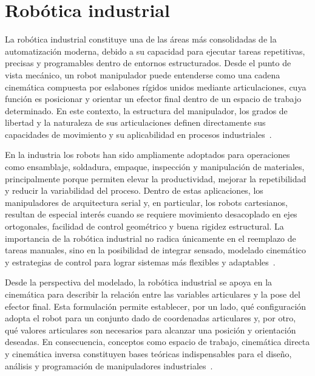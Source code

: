 
\section{Robótica industrial}
La robótica industrial constituye una de las áreas más consolidadas de la automatización moderna, debido a su capacidad para ejecutar tareas repetitivas, precisas y programables dentro de entornos estructurados. Desde el punto de vista mecánico, un robot manipulador puede entenderse como una cadena cinemática compuesta por eslabones rígidos unidos mediante articulaciones, cuya función es posicionar y orientar un efector final dentro de un espacio de trabajo determinado. En este contexto, la estructura del manipulador, los grados de libertad y la naturaleza de sus articulaciones definen directamente sus capacidades de movimiento y su aplicabilidad en procesos industriales~\cite{lynch2017modern,siciliano2010robotics}.

En la industria los robots han sido ampliamente adoptados para operaciones como ensamblaje, soldadura, empaque, inspección y manipulación de materiales, principalmente porque permiten elevar la productividad, mejorar la repetibilidad y reducir la variabilidad del proceso. Dentro de estas aplicaciones, los manipuladores de arquitectura serial y, en particular, los robots cartesianos, resultan de especial interés cuando se requiere movimiento desacoplado en ejes ortogonales, facilidad de control geométrico y buena rigidez estructural. La importancia de la robótica industrial no radica únicamente en el reemplazo de tareas manuales, sino en la posibilidad de integrar sensado, modelado cinemático y estrategias de control para lograr sistemas más flexibles y adaptables~\cite{siciliano2010robotics}.

Desde la perspectiva del modelado, la robótica industrial se apoya en la cinemática para describir la relación entre las variables articulares y la pose del efector final. Esta formulación permite establecer, por un lado, qué configuración adopta el robot para un conjunto dado de coordenadas articulares y, por otro, qué valores articulares son necesarios para alcanzar una posición y orientación deseadas. En consecuencia, conceptos como espacio de trabajo, cinemática directa y cinemática inversa constituyen bases teóricas indispensables para el diseño, análisis y programación de manipuladores industriales~\cite{murray1994robotic,lynch2017modern}.


